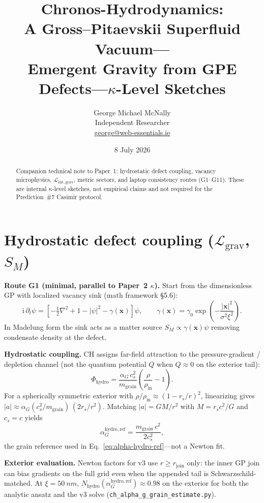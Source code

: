 \documentclass[11pt,a4paper]{article}
\title{%
  Chronos-Hydrodynamics:\\
  A Gross--Pitaevskii Superfluid Vacuum---\\
  Emergent Gravity from GPE Defects---$\kappa$-Level Sketches%
}
\author{%
  George Michael McNally\\[0.25em]
  \small Independent Researcher\\[0.15em]
  \small \href{mailto:george@web-essentials.ie}{george@web-essentials.ie}%
}
\date{8 July 2026}
\begin{document}
\maketitle
\begin{abstract}
Companion technical note to Paper~1: hydrostatic defect coupling, vacancy microphysics,
$\mathcal{L}_{\mathrm{int,grav}}$, metric sectors, and laptop consistency routes (G1--G11).
These are internal $\kappa$-level sketches, not empirical claims and not required for the
Prediction~\#7 Casimir protocol.
\end{abstract}
\section{Hydrostatic defect coupling \texorpdfstring{($\mathcal{L}_{\mathrm{grav}}$, $S_M$)}{(L\_grav, S\_M)}}
\label{app:lgrav}

\textbf{Route G1 (minimal, parallel to Paper~2 $\kappa$).}
Start from the dimensionless GP with localized vacancy sink (math framework \S5.6):
\begin{equation}
  \mathrm{i}\,\partial_t \psi = \left[-\tfrac{1}{2}\nabla^2 + 1 - |\psi|^2 - \gamma(\mathbf{x})\right]\psi,
  \qquad
  \gamma(\mathbf{x}) = \gamma_0 \exp\!\left(-\frac{|\mathbf{x}|^2}{\sigma^2 \xi^2}\right).
  \label{eq:app-sm-sink}
\end{equation}
In Madelung form the sink acts as a matter source $S_M \propto \gamma(\mathbf{x})\psi$ removing condensate density at the defect.

\textbf{Hydrostatic coupling.}
CH assigns far-field attraction to the pressure-gradient / depletion channel (not the quantum potential $Q$ when $Q \approx 0$ on the exterior tail):
\begin{equation}
  \Phi_{\mathrm{hydro}} = \frac{\alpha_G\, c_s^2}{m_{\mathrm{grain}}}\left(\frac{\rho}{\rho_{\mathrm{in}}} - 1\right).
  \label{eq:app-phi-hydro}
\end{equation}
For a spherically symmetric exterior with $\rho/\rho_{\mathrm{in}} \approx (1 - r_s/r)^2$, linearizing gives $|a| \approx \alpha_G (c_s^2/m_{\mathrm{grain}})\,(2 r_s/r^2)$.
Matching $|a| = GM/r^2$ with $M = r_s c^2/G$ and $c_s = c$ yields
\begin{equation}
  \alpha_G^{\mathrm{hydro,ref}} = \frac{m_{\mathrm{grain}}\, c^2}{2 c_s^2},
  \label{eq:app-alpha-ref}
\end{equation}
the grain reference used in Eq.~\ref{eq:alpha-hydro-ref}---not a Newton fit.

\textbf{Exterior evaluation.}
Newton factors for v3 use $r \geq r_{\mathrm{join}}$ only: the inner GP join can bias gradients on the full grid even when the appended tail is Schwarzschild-matched.
At $\xi = \SI{50}{nm}$, $N_{\mathrm{hydro}}(\alpha_G^{\mathrm{hydro,ref}}) \approx 0.98$ on the exterior for both the analytic ansatz and the v3 solve (\texttt{ch\_alpha\_g\_grain\_estimate.py}).
\end{document}
